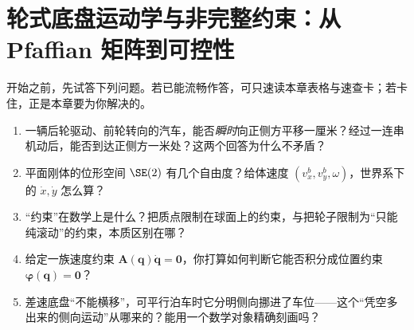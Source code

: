 \chapter{轮式底盘运动学与非完整约束：从 Pfaffian 矩阵到可控性}\label{ch:mm-wheeled}


\begin{practice}[前置自测]
开始之前，先试答下列问题。若已能流畅作答，可只速读本章表格与速查卡；若卡住，正是本章要为你解决的。
\begin{enumerate}
  \item 一辆后轮驱动、前轮转向的汽车，能否\emph{瞬时}向正侧方平移一厘米？经过一连串机动后，能否到达正侧方一米处？这两个回答为什么不矛盾？
  \item 平面刚体的位形空间 $\SE(2)$ 有几个自由度？给体速度 $(v_x^b,v_y^b,\omega)$，世界系下的 $\dot{x},\dot{y}$ 怎么算？
  \item “约束”在数学上是什么？把质点限制在球面上的约束，与把轮子限制为“只能纯滚动”的约束，本质区别在哪？
  \item 给定一族速度约束 $\mathbf{A}(\mathbf{q})\dot{\mathbf{q}}=\mathbf{0}$，你打算如何判断它能否积分成位置约束 $\boldsymbol{\varphi}(\mathbf{q})=\mathbf{0}$？
  \item 差速底盘“不能横移”，可平行泊车时它分明侧向挪进了车位——这个“凭空多出来的侧向运动”从哪来的？能用一个数学对象精确刻画吗？
\end{enumerate}
\end{practice}

